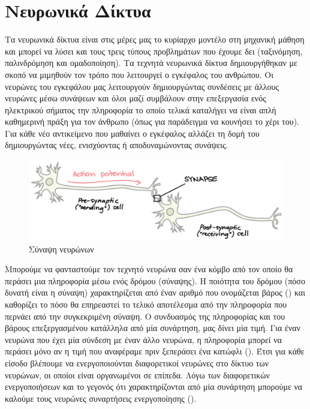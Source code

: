 \newpage
\section{Νευρωνικά Δίκτυα}
Τα νευρωνικά δίκτυα είναι στις μέρες μας το κυρίαρχο μοντέλο στη μηχανική μάθηση και μπορεί να λύσει και τους τρεις τύπους προβλημάτων που έχουμε δει (ταξινόμηση, παλινδρόμηση και ομαδοποίηση). Τα τεχνητά νευρωνικά δίκτυα δημιουργήθηκαν με
σκοπό να μιμηθούν τον τρόπο που λειτουργεί ο εγκέφαλος του ανθρώπου. Οι νευρώνες του εγκεφάλου μας λειτουργούν δημιουργώντας συνδέσεις με άλλους νευρώνες μέσω συνάψεων και όλοι μαζί συμβάλουν στην επεξεργασία ενός ηλεκτρικού σήματος
την πληροφορία το οποίο τελικά καταλήγει να είναι απλή καθημερινή πράξη για τον άνθρωπο (όπως για παράδειγμα να κουνήσει το χέρι του)\cite{nnip}. Για κάθε νέο αντικείμενο που μαθαίνει ο εγκέφαλος αλλάζει τη δομή του
δημιουργώντας νέες, ενισχύοντας ή αποδυναμώνοντας συνάψεις.

\begin{figure}[H]
    \centering
    \includegraphics[width=1\textwidth]{images/synapse.png}
    \caption{Σύναψη νευρώνων}
\end{figure}

Μπορούμε να φανταστούμε
τον τεχνητό νευρώνα σαν ένα κόμβο από τον οποίο θα περάσει μια πληροφορία μέσω ενός
δρόμου (σύναψης). Η ποιότητα του δρόμου (πόσο δυνατή είναι η σύναψη) χαρακτηρίζεται
από έναν αριθμό που ονομάζεται βάρος () και καθορίζει το πόσο θα επηρεαστεί το
τελικό αποτέλεσμα από την πληροφορία που περνάει από την συγκεκριμένη σύναψη. Ο
συνδυασμός της πληροφορίας και του βάρους επεξεργασμένου κατάλληλα από μία
συνάρτηση, μας δίνει μία τιμή. Για έναν νευρώνα που έχει μία σύνδεση με έναν άλλο
νευρώνα, η πληροφορία μπορεί να περάσει μόνο αν η τιμή που αναφέραμε πριν ξεπεράσει
ένα κατώφλι (). Έτσι για κάθε είσοδο βλέπουμε να ενεργοποιούνται διαφορετικοί
νευρώνες στο δίκτυο των νευρώνων, οι οποίοι είναι οργανωμένοι σε επίπεδα. Λόγω των
διαφορετικών ενεργοποιήσεων και το γεγονός ότι χαρακτηρίζονται από μία συνάρτηση
μπορούμε να καλούμε τους νευρώνες συναρτήσεις ενεργοποίησης ().

